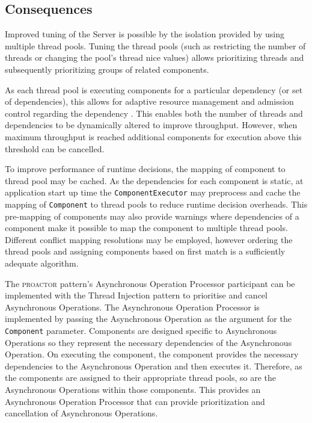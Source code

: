 \documentclass[prodmode]{style/acmlarge}
\begin{document}
\subsection{Consequences}

Improved tuning of the Server is possible by the isolation provided by using
multiple thread pools.  Tuning the thread pools (such as restricting the number
of threads or changing the pool's thread nice values) allows prioritizing
threads and subsequently prioritizing groups of related components.

As each thread pool is executing components for a particular dependency (or set
of dependencies), this allows for adaptive resource management and admission
control regarding the dependency \cite{seda}.  This enables both the number of
threads and dependencies to be dynamically altered to improve throughput.
However, when maximum throughput is reached additional components for execution
above this threshold can be cancelled.

To improve performance of runtime decisions, the mapping of component to thread
pool may be cached.  As the dependencies for each component is static, at
application start up time the \texttt{ComponentExecutor} may preprocess and
cache the mapping of \texttt{Component} to thread pools to reduce runtime
decision overheads.  This pre-mapping of components may also provide warnings
where dependencies of a component make it possible to map the component to
multiple thread pools.  Different conflict mapping resolutions may be employed,
however ordering the thread pools and assigning components based on first match
is a sufficiently adequate algorithm.

The \textsc{proactor} pattern's Asynchronous Operation Processor participant can
be implemented with the Thread Injection pattern to prioritise and cancel
Asynchronous Operations.  The Asynchronous Operation Processor is implemented by
passing the Asynchronous Operation as the argument for the \texttt{Component}
parameter.  Components are designed specific to Asynchronous Operations so they
represent the necessary dependencies of the Asynchronous Operation.  On
executing the component, the component provides the necessary dependencies to
the Asynchronous Operation and then executes it.  Therefore, as the components
are assigned to their appropriate thread pools, so are the Asynchronous
Operations within those components.  This provides an Asynchronous Operation
Processor that can provide prioritization and cancellation of Asynchronous
Operations.
\end{document}
